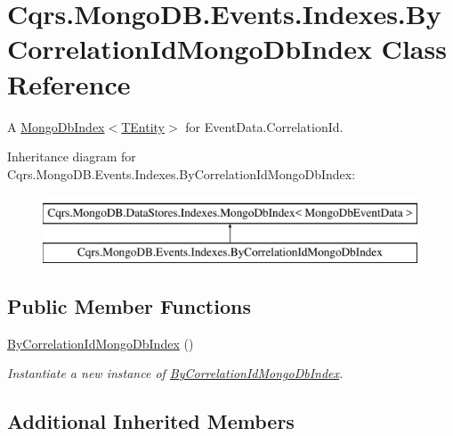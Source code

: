 \hypertarget{classCqrs_1_1MongoDB_1_1Events_1_1Indexes_1_1ByCorrelationIdMongoDbIndex}{}\section{Cqrs.\+Mongo\+D\+B.\+Events.\+Indexes.\+By\+Correlation\+Id\+Mongo\+Db\+Index Class Reference}
\label{classCqrs_1_1MongoDB_1_1Events_1_1Indexes_1_1ByCorrelationIdMongoDbIndex}


A \hyperlink{classCqrs_1_1MongoDB_1_1DataStores_1_1Indexes_1_1MongoDbIndex_a61f4b17dd968f92e81562c70ae062a89_a61f4b17dd968f92e81562c70ae062a89}{Mongo\+Db\+Index$<$\+T\+Entity$>$} for Event\+Data.\+Correlation\+Id.  


Inheritance diagram for Cqrs.\+Mongo\+D\+B.\+Events.\+Indexes.\+By\+Correlation\+Id\+Mongo\+Db\+Index\+:\begin{figure}[H]
\begin{center}
\leavevmode
\includegraphics[height=2.000000cm]{classCqrs_1_1MongoDB_1_1Events_1_1Indexes_1_1ByCorrelationIdMongoDbIndex}
\end{center}
\end{figure}
\subsection*{Public Member Functions}
\begin{DoxyCompactItemize}
\item 
\hyperlink{classCqrs_1_1MongoDB_1_1Events_1_1Indexes_1_1ByCorrelationIdMongoDbIndex_a7bfea0225205a97ffd3501ba5032b5b3_a7bfea0225205a97ffd3501ba5032b5b3}{By\+Correlation\+Id\+Mongo\+Db\+Index} ()
\begin{DoxyCompactList}\small\item\em Instantiate a new instance of \hyperlink{classCqrs_1_1MongoDB_1_1Events_1_1Indexes_1_1ByCorrelationIdMongoDbIndex}{By\+Correlation\+Id\+Mongo\+Db\+Index}. \end{DoxyCompactList}\end{DoxyCompactItemize}
\subsection*{Additional Inherited Members}


